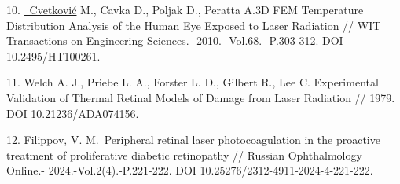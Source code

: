 \begin{references}
10. \href{https://www.researchgate.net/profile/Mario-Cvetkovic?_tp=eyJjb250ZXh0Ijp7ImZpcnN0UGFnZSI6InB1YmxpY2F0aW9uIiwicGFnZSI6InB1YmxpY2F0aW9uIn19}{~Cvetković}
M., Cavka D., Poljak D., Peratta A.3D FEM Temperature Distribution
Analysis of the Human Eye Exposed to Laser Radiation // WIT Transactions
on Engineering Sciences. -2010.- Vol.68.- P.303-312. DOI
10.2495/HT100261.

11. Welch A. J., Priebe L. A., Forster L. D., Gilbert R., Lee C.
Experimental Validation of Thermal Retinal Models of Damage from Laser
Radiation // 1979. DOI 10.21236/ADA074156.

12. Filippov, V. M.~Peripheral retinal laser photocoagulation in the
proactive treatment of proliferative diabetic retinopathy // Russian
Ophthalmology Online.- 2024.-Vol.2(4).-P.221-222.
DOI 10.25276/2312-4911-2024-4-221-222.
\end{references}

